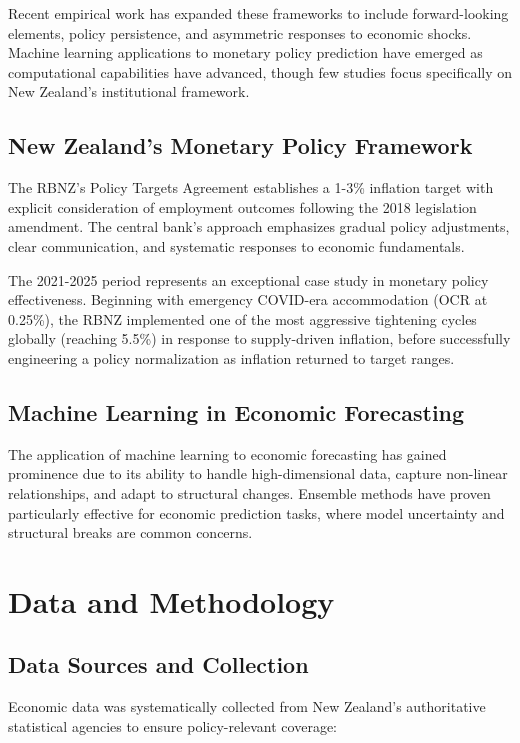 \documentclass[11pt,a4paper]{article}
\begin{document}
	Recent empirical work has expanded these frameworks to include forward-looking elements, policy persistence, and asymmetric responses to economic shocks. Machine learning applications to monetary policy prediction have emerged as computational capabilities have advanced, though few studies focus specifically on New Zealand's institutional framework.
	
	\subsection{New Zealand's Monetary Policy Framework}
	The RBNZ's Policy Targets Agreement establishes a 1-3\% inflation target with explicit consideration of employment outcomes following the 2018 legislation amendment. The central bank's approach emphasizes gradual policy adjustments, clear communication, and systematic responses to economic fundamentals.
	
	The 2021-2025 period represents an exceptional case study in monetary policy effectiveness. Beginning with emergency COVID-era accommodation (OCR at 0.25\%), the RBNZ implemented one of the most aggressive tightening cycles globally (reaching 5.5\%) in response to supply-driven inflation, before successfully engineering a policy normalization as inflation returned to target ranges.
	
	\subsection{Machine Learning in Economic Forecasting}
	The application of machine learning to economic forecasting has gained prominence due to its ability to handle high-dimensional data, capture non-linear relationships, and adapt to structural changes. Ensemble methods have proven particularly effective for economic prediction tasks, where model uncertainty and structural breaks are common concerns.
	
	\section{Data and Methodology}
	
	\subsection{Data Sources and Collection}
	Economic data was systematically collected from New Zealand's authoritative statistical agencies to ensure policy-relevant coverage:
	
\end{document}
